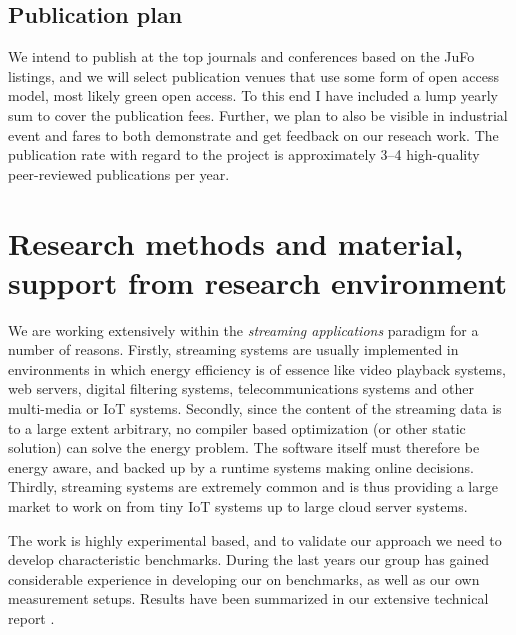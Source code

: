 \documentclass{article}
\begin{document}
\subsection{Publication plan}
We intend to publish at the top journals and conferences based on the JuFo listings, and we will select publication venues that use some form of open access model, most likely green open access. 
To this end I have included a lump yearly sum to cover the publication fees. 
Further, we plan to also be visible in industrial event and fares to both demonstrate and get feedback on our reseach work.
The publication rate with regard to the project is approximately 3--4 high-quality peer-reviewed publications per year.

\section{Research methods and material, support from research environment}

We are working extensively within the \textit{streaming applications} paradigm for a number of reasons. 
Firstly, streaming systems are usually implemented in environments in which energy efficiency is of essence like video playback systems, web servers, digital filtering systems, telecommunications systems and other multi-media or IoT systems. 
Secondly, since the content of the streaming data is to a large extent arbitrary, no compiler based optimization (or other static solution) can solve the energy problem. 
The software itself must therefore be energy aware, and backed up by a runtime systems making online decisions. 
Thirdly, streaming systems are extremely common and is thus providing a large market to work on from tiny IoT systems up to large cloud server systems.

The work is highly experimental based, and to validate our approach we need to develop characteristic benchmarks. 
During the last years our group has gained considerable experience in developing our on benchmarks, as well as our own measurement setups. 
Results have been summarized in our extensive technical report \cite{HolmbackaTechrep}. 
\end{document}
